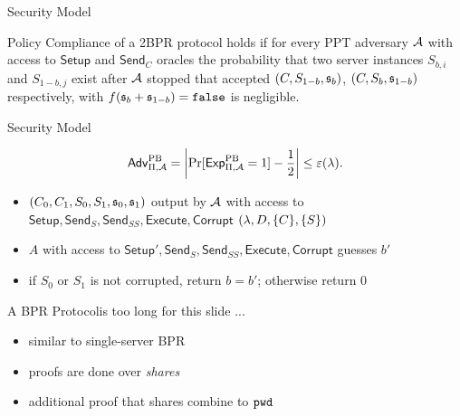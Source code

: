 \documentclass[notes,xcolor=dvipsnames]{beamer}
\begin{document}
\begin{frame}{Security Model}
  \begin{definition}\label{def:pc}
  Policy Compliance of a 2BPR protocol holds if for every PPT adversary $\mathcal{A}$ with access to $\mathsf{Setup}$ and $\mathsf{Send}_C$ oracles the probability that two server instances $S_{b,i}$ and $S_{1-b,j}$ exist after $\mathcal{A}$ stopped that accepted $(C,S_{1-b},\mathfrak{s}_b)$, $(C,S_{b},\mathfrak{s}_{1-b})$ respectively, with $f(\mathfrak{s}_b+\mathfrak{s}_{1-b})=\mathtt{false}$ is negligible.
  \end{definition}
\end{frame}

\begin{frame}{Security Model}
  \begin{definition}\label{def:zk}
  \[ \mathsf{Adv}_{\Pi, \mathcal{A}}^{\mathrm{PB}}=\left|\Pr[\mathsf{Exp}_{\Pi, \mathcal{A}}^{\mathrm{PB}}=1]-\frac{1}{2}\right|\leq\varepsilon(\lambda). \]

  \begin{itemize}
    \item $(C_0, C_1, S_0, S_1,\mathfrak{s}_0,\mathfrak{s}_1)$ output by $\mathcal{A}$ with access to $\mathsf{Setup},\mathsf{Send}_S,\mathsf{Send}_{SS}, \mathsf{Execute},\mathsf{Corrupt}$ $(\lambda,D,\{C\},\{S\})$ 
    \item $A$ with access to $\mathsf{Setup}',\mathsf{Send}_S,\mathsf{Send}_{SS}, \mathsf{Execute},\mathsf{Corrupt}$ guesses $b'$
    \item if $S_0$ or $S_1$ is not corrupted, return $b=b'$; otherwise return $0$ 
  \end{itemize}

  \end{definition}
\end{frame}

\begin{frame}{A BPR Protocol}{is too long for this slide ...}
  \begin{itemize}
    \item similar to single-server BPR
    \item proofs are done over \textit{shares}
    \item additional proof that shares combine to $\mathtt{pwd}$
  \end{itemize}
\end{frame}
\end{document}
